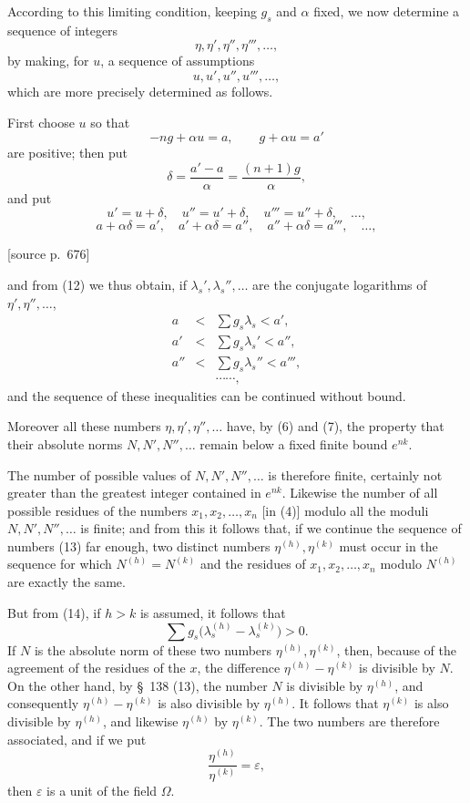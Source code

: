 \documentclass[11pt]{article}
\newcommand{\srcpage}[1]{\par\medskip\noindent\textsf{[source p.~#1]}\par\smallskip}
\begin{document}
According to this limiting condition, keeping $g_s$ and $\alpha$ fixed, we now determine a sequence of integers
\begin{equation}
\eta,\eta',\eta'',\eta''',\ldots,
\tag{13}
\end{equation}
by making, for $u$, a sequence of assumptions
\[
u,u',u'',u''',\ldots,
\]
which are more precisely determined as follows.

First choose $u$ so that
\[
-ng+\alpha u=a,
\qquad
 g+\alpha u=a'
\]
are positive; then put
\[
\delta=\frac{a'-a}{\alpha}=\frac{(n+1)g}{\alpha},
\]
and put
\[
u'=u+\delta,
\quad
u''=u'+\delta,
\quad
u'''=u''+\delta,
\quad\ldots,
\]
\[
a+\alpha\delta=a',
\quad a'+\alpha\delta=a'',
\quad a''+\alpha\delta=a''',
\quad\ldots,
\]
\srcpage{676}
and from (12) we thus obtain, if $\lambda_s',\lambda_s'',\ldots$ are the conjugate logarithms of $\eta',\eta'',\ldots$,
\begin{equation}
\begin{array}{rcl}
a&<&\sum g_s\lambda_s<a',\\
a'&<&\sum g_s\lambda_s'<a'',\\
a''&<&\sum g_s\lambda_s''<a''',\\
&&\cdots\cdots,
\end{array}
\tag{14}
\end{equation}
and the sequence of these inequalities can be continued without bound.

Moreover all these numbers $\eta,\eta',\eta'',\ldots$ have, by (6) and (7), the property that their absolute norms $N,N',N'',\ldots$ remain below a fixed finite bound $e^{nk}$.

The number of possible values of $N,N',N'',\ldots$ is therefore finite, certainly not greater than the greatest integer contained in $e^{nk}$. Likewise the number of all possible residues of the numbers $x_1,x_2,\ldots,x_n$ [in (4)] modulo all the moduli $N,N',N'',\ldots$ is finite; and from this it follows that, if we continue the sequence of numbers (13) far enough, two distinct numbers $\eta^{(h)},\eta^{(k)}$ must occur in the sequence for which $N^{(h)}=N^{(k)}$ and the residues of $x_1,x_2,\ldots,x_n$ modulo $N^{(h)}$ are exactly the same.

But from (14), if $h>k$ is assumed, it follows that
\begin{equation}
\sum g_s\bigl(\lambda_s^{(h)}-\lambda_s^{(k)}\bigr)>0.
\tag{15}
\end{equation}
If $N$ is the absolute norm of these two numbers $\eta^{(h)},\eta^{(k)}$, then, because of the agreement of the residues of the $x$, the difference $\eta^{(h)}-\eta^{(k)}$ is divisible by $N$. On the other hand, by \S~138 (13), the number $N$ is divisible by $\eta^{(h)}$, and consequently $\eta^{(h)}-\eta^{(k)}$ is also divisible by $\eta^{(h)}$. It follows that $\eta^{(k)}$ is also divisible by $\eta^{(h)}$, and likewise $\eta^{(h)}$ by $\eta^{(k)}$. The two numbers are therefore associated, and if we put
\[
\frac{\eta^{(h)}}{\eta^{(k)}}=\varepsilon,
\]
then $\varepsilon$ is a unit of the field $\Omega$.
\end{document}
